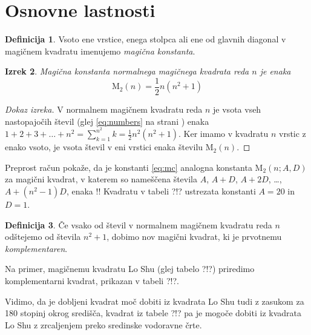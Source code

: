 \documentclass[a4paper,12pt]{article}
\newenvironment{dokaz}{\begin{proof}[Dokaz izreka]}{\end{proof}}
\theoremstyle{plain}
\newtheorem{izrek}{Izrek}[section]
\theoremstyle{definition}
\newtheorem{definicija}[izrek]{Definicija}
\newcommand{\m}{\ensuremath{\mathrm{M}_2}}
\newcommand{\pojem}[1]{\emph{\color{purple}#1}}
\begin{document}
\section{Osnovne lastnosti}

\begin{definicija}
      Vsoto ene vrstice, enega stolpca ali ene od glavnih diagonal
      v magičnem kvadratu imenujemo \pojem{magična konstanta}.
\end{definicija}

\begin{izrek}
   Magična konstanta normalnega magičnega kvadrata reda $n$
   je enaka
   \begin{equation}
      \label{eq:mc}
      \m(n) = \frac{1}{2} n(n^2+1)
   \end{equation}
\end{izrek}

\begin{dokaz}
   V normalnem magičnem kvadratu reda $n$ je vsota vseh nastopajočih
   števil (glej \eqref{eq:numbers} na strani \pageref{eq:numbers}) enaka
   $1+2+3+\dots+n^2=\sum_{k=1}^{n^2}k=\frac{1}{2}n^2(n^2+1)$. Ker imamo
   v kvadratu $n$ vrstic z enako vsoto, je vsota števil v eni vrstici
   enaka številu $\m(n)$. %
\end{dokaz}

Preprost račun pokaže, da je konstanti \eqref{eq:mc} analogna konstanta
$\m(n;A,D)$ za magični kvadrat, v katerem so nameščena števila
$A$, $A+D$, $A+2D$, \dots, $A+(n^2-1)D$, enaka %
!!
Kvadratu v tabeli ?!? ustrezata konstanti $A=20$ in $D=1$.

\begin{definicija}
      Če vsako od števil v normalnem magičnem kvadratu reda $n$ odštejemo
      od števila $n^2+1$, dobimo nov magični kvadrat, ki je prvotnemu
      \pojem{komplementaren}.
\end{definicija}

Na primer, magičnemu kvadratu Lo Shu (glej tabelo ?!?) priredimo
komplementarni kvadrat, prikazan v tabeli ?!?.
%

Vidimo, da je dobljeni kvadrat moč dobiti iz kvadrata Lo Shu tudi z zasukom za
180 stopinj okrog središča, kvadrat iz tabele ?!? pa je mogoče dobiti
iz kvadrata Lo Shu z zrcaljenjem preko sredinske vodoravne črte.
\end{document}
